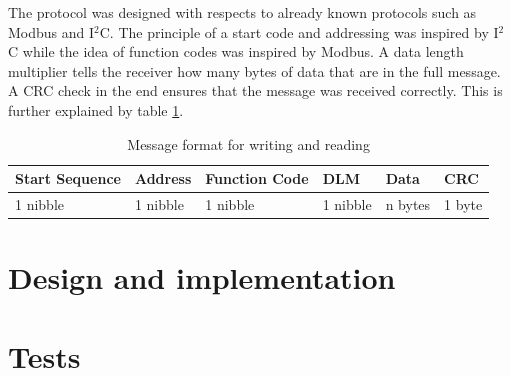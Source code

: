 The protocol was designed with respects to already known protocols such as Modbus and I$^{2}$C. The principle of a start code and addressing was inspired by I$^{2}$C while the idea of function codes was inspired by Modbus. A data length multiplier tells the receiver how many bytes of data that are in the full message. A CRC check in the end ensures that the message was received correctly. This is further explained by table \ref{table:stdmsgtosensor}.
\begin{table}[H]
\centering
\begin{tabular}{|l|l|l|l|l|l|}
	\hline
	Start Sequence & Address & Function Code & DLM & Data & CRC  \\ \hline
	1 nibble & 1 nibble	& 1 nibble & 1 nibble & n bytes & 1 byte\\
	\hline
\end{tabular}
\caption{Message format for writing and reading}
\label{table:stdmsgtosensor}
\end{table}
\section{Design and implementation}

\section{Tests}
